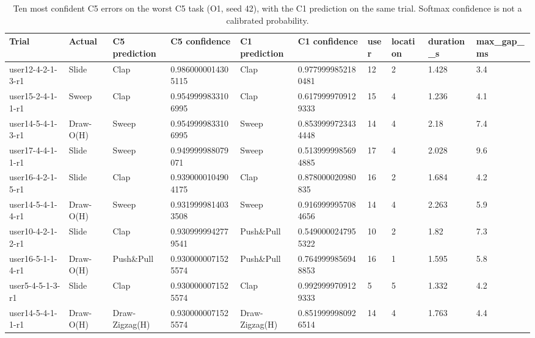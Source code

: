 \begin{table}[t]
\centering
\small
\caption{Ten most confident C5 errors on the worst C5 task (O1, seed 42), with the C1 prediction on the same trial. Softmax confidence is not a calibrated probability.}
\label{tab:T10_failure_cases}
\begin{tabular}{llllllllll}
\hline
Trial & Actual & C5 prediction & C5 confidence & C1 prediction & C1 confidence & user & location & duration\_s & max\_gap\_ms \\
\hline
user12-4-2-1-3-r1 & Slide & Clap & 0.9860000014305115 & Clap & 0.9779999852180481 & 12 & 2 & 1.428 & 3.4 \\
user15-2-4-1-1-r1 & Sweep & Clap & 0.9549999833106995 & Clap & 0.6179999709129333 & 15 & 4 & 1.236 & 4.1 \\
user14-5-4-1-3-r1 & Draw-O(H) & Sweep & 0.9549999833106995 & Sweep & 0.8539999723434448 & 14 & 4 & 2.18 & 7.4 \\
user17-4-4-1-1-r1 & Slide & Sweep & 0.949999988079071 & Sweep & 0.5139999985694885 & 17 & 4 & 2.028 & 9.6 \\
user16-4-2-1-5-r1 & Slide & Clap & 0.9390000104904175 & Clap & 0.878000020980835 & 16 & 2 & 1.684 & 4.2 \\
user14-5-4-1-4-r1 & Draw-O(H) & Sweep & 0.9319999814033508 & Sweep & 0.9169999957084656 & 14 & 4 & 2.263 & 5.9 \\
user10-4-2-1-2-r1 & Slide & Clap & 0.9309999942779541 & Push\&Pull & 0.5490000247955322 & 10 & 2 & 1.82 & 7.3 \\
user16-5-1-1-4-r1 & Draw-O(H) & Push\&Pull & 0.9300000071525574 & Push\&Pull & 0.7649999856948853 & 16 & 1 & 1.595 & 5.8 \\
user5-4-5-1-3-r1 & Slide & Clap & 0.9300000071525574 & Clap & 0.9929999709129333 & 5 & 5 & 1.332 & 4.2 \\
user14-5-4-1-1-r1 & Draw-O(H) & Draw-Zigzag(H) & 0.9300000071525574 & Draw-Zigzag(H) & 0.8519999980926514 & 14 & 4 & 1.763 & 4.4 \\
\hline
\end{tabular}
\end{table}
